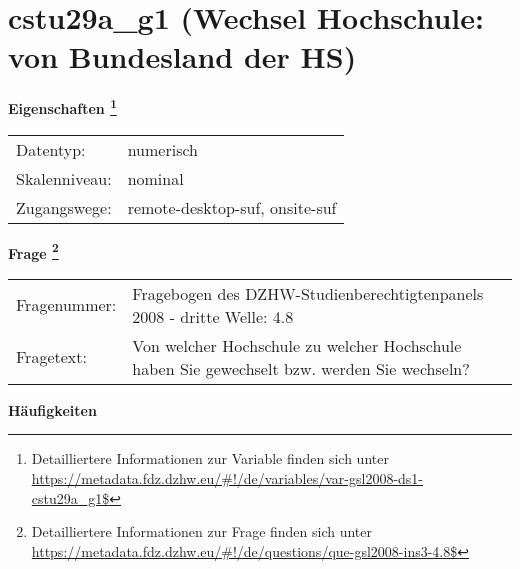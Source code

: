 
    \setcounter{footnote}{0}

    \vspace*{-1.8cm}
	\section{cstu29a\_g1 (Wechsel Hochschule: von Bundesland der HS)}
	\label{section:cstu29a_g1}



    \vspace*{0.5cm}
    \noindent\textbf{Eigenschaften
	\footnote{Detailliertere Informationen zur Variable finden sich unter
		\url{https://metadata.fdz.dzhw.eu/\#!/de/variables/var-gsl2008-ds1-cstu29a_g1$}}}\\
	\begin{tabularx}{\hsize}{@{}lX}
	Datentyp: & numerisch \\
	Skalenniveau: & nominal \\
	Zugangswege: &
	  remote-desktop-suf, 
	  onsite-suf
 \\
    \end{tabularx}



				\vspace*{0.5cm}
                \noindent\textbf{Frage
	                \footnote{Detailliertere Informationen zur Frage finden sich unter
		              \url{https://metadata.fdz.dzhw.eu/\#!/de/questions/que-gsl2008-ins3-4.8$}}}\\
				\begin{tabularx}{\hsize}{@{}lX}
					Fragenummer: &
					  Fragebogen des DZHW-Studienberechtigtenpanels 2008 - dritte Welle:
					  4.8
 \\
					Fragetext: & Von welcher Hochschule zu welcher Hochschule haben Sie gewechselt bzw. werden Sie wechseln? \\
				\end{tabularx}





        		\vspace*{0.5cm}
                \noindent\textbf{Häufigkeiten}

